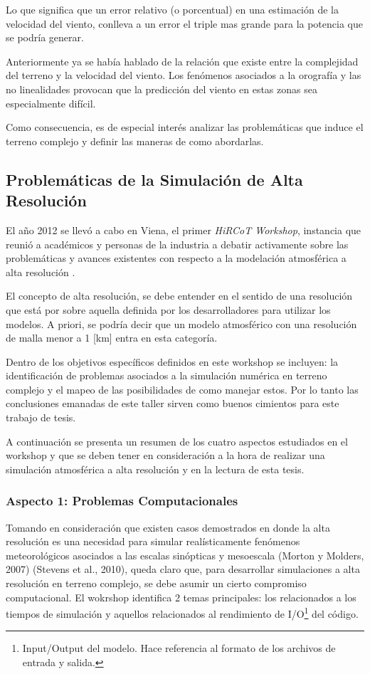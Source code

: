 Lo que significa que un error relativo (o porcentual) en una estimación de la velocidad del viento, conlleva a un error el triple mas grande para la potencia que se podría generar.

Anteriormente ya se había hablado de la relación que existe entre la complejidad del terreno y la velocidad del viento. Los fenómenos asociados a la orografía y las no linealidades provocan que la predicción del viento en estas zonas sea especialmente difícil. 

Como consecuencia, es de especial interés analizar las problemáticas que induce el terreno complejo y definir las maneras de como abordarlas.
\subsection{Problemáticas de la Simulación de Alta Resolución}
El año 2012 se llevó a cabo en Viena, el primer \emph{HiRCoT Workshop}, instancia que reunió a académicos y personas de la industria a debatir activamente sobre las problemáticas y avances existentes con respecto a la modelación atmosférica a alta resolución \cite{Arnold2010}.

El concepto de alta resolución, se debe entender en el sentido de una resolución que está por sobre aquella definida por los desarrolladores para utilizar los modelos. A priori, se podría decir que un modelo atmosférico con una resolución de malla menor a 1 [km] entra en esta categoría.

Dentro de los objetivos específicos definidos en este workshop se incluyen: la identificación de problemas asociados a la simulación numérica en terreno complejo y el mapeo de las posibilidades de como manejar estos. Por lo tanto las conclusiones emanadas de este taller sirven como buenos cimientos para este trabajo de tesis.

A continuación se presenta un resumen de los cuatro aspectos estudiados en el workshop y que se deben tener en consideración a la hora de realizar una simulación atmosférica a alta resolución y en la lectura de esta tesis.

\subsubsection{Aspecto 1: Problemas Computacionales}
Tomando en consideración que existen casos demostrados en donde la alta resolución es una necesidad para simular realísticamente fenómenos meteorológicos asociados a las escalas sinópticas y mesoescala (Morton y Molders, 2007) (Stevens et al., 2010), queda claro que, para desarrollar simulaciones a alta resolución en terreno complejo, se debe asumir un cierto compromiso computacional. El wokrshop identifica 2 temas principales: los relacionados a los tiempos de simulación y aquellos relacionados al rendimiento de I/O\footnote{Input/Output del modelo. Hace referencia al formato de los archivos de entrada y salida.} del código.

